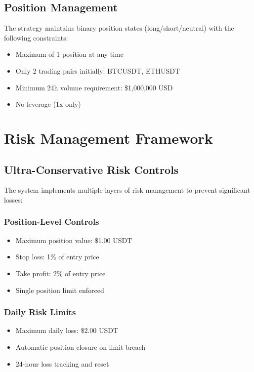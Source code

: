 \documentclass[12pt,a4paper]{article}
\begin{document}
\subsection{Position Management}
The strategy maintains binary position states (long/short/neutral) with the following constraints:

\begin{itemize}
\item Maximum of 1 position at any time
\item Only 2 trading pairs initially: BTCUSDT, ETHUSDT
\item Minimum 24h volume requirement: \$1,000,000 USD
\item No leverage (1x only)
\end{itemize}

\section{Risk Management Framework}

\subsection{Ultra-Conservative Risk Controls}
The system implements multiple layers of risk management to prevent significant losses:

\subsubsection{Position-Level Controls}
\begin{itemize}
\item Maximum position value: \$1.00 USDT
\item Stop loss: 1\% of entry price
\item Take profit: 2\% of entry price
\item Single position limit enforced
\end{itemize}

\subsubsection{Daily Risk Limits}
\begin{itemize}
\item Maximum daily loss: \$2.00 USDT
\item Automatic position closure on limit breach
\item 24-hour loss tracking and reset
\end{itemize}
\end{document}
